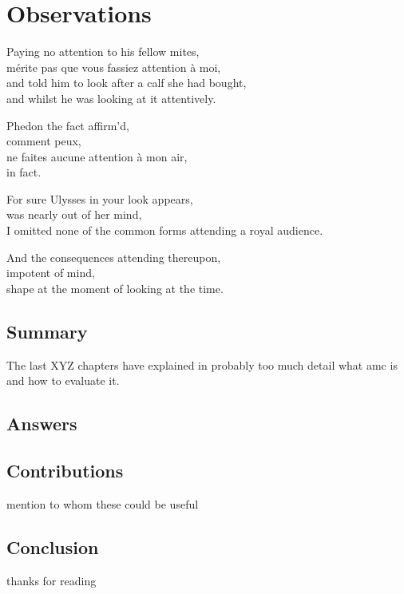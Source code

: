 
\chapter{Observations}
\label{ch:observations}

\startcontents[chapters]

\vfill

Paying no attention to his fellow mites, \\
mérite pas que vous fassiez attention à moi, \\
and told him to look after a calf she had bought, \\
and whilst he was looking at it attentively.

Phedon the fact affirm'd, \\
comment peux, \\
ne faites aucune attention à mon air, \\
in fact.

For sure Ulysses in your look appears, \\
was nearly out of her mind, \\
I omitted none of the common forms attending a royal audience.

And the consequences attending thereupon, \\
impotent of mind, \\
shape at the moment of looking at the time.

\newpage
\minicontents
\spirals



\section{Summary}

The last XYZ chapters have explained in probably too much detail what \gls{amc} is and how to evaluate it.


\section{Answers}

\section{Contributions}

mention to whom these could be useful


\section{Conclusion}

thanks for reading


\stopcontents[chapters]
